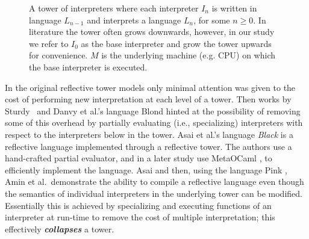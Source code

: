 \documentclass[sigplan,anonymous,review]{acmart}
\theoremstyle{definition}
\begin{document}
\begin{figure}[t]
    \centering
    \caption{A tower of interpreters where each interpreter $I_n$ is written in language $L_{n-1}$ and interprets a language $L_n$, for some $n \geq 0$. In literature the tower often grows downwards, however, in our study we refer to $I_0$ as the base interpreter and grow the tower upwards for convenience. $M$ is the underlying machine (e.g. CPU) on which the base interpreter is executed.}
    \label{fig:tombstone_tower_ex1}
\end{figure}

In the original reflective tower models only minimal attention was given to the cost of performing new interpretation at each level of a tower. Then works by Sturdy~\cite{sturdy1993lisp} and Danvy et al.'s language Blond \cite{danvy1988intensions} hinted at the possibility of removing some of this overhead by partially evaluating (i.e., specializing) interpreters with respect to the interpreters below in the tower. Asai et al.'s language \textit{Black} \cite{asai1996duplication} is a reflective language implemented through a reflective tower. The authors use a hand-crafted partial evaluator, and in a later study use MetaOCaml \cite{asai2015compiling}, to efficiently implement the language. Asai and then, using the language Pink \cite{amin2017collapsing}, Amin et al.~demonstrate the ability to compile a reflective language even though the semantics of individual interpreters in the underlying tower can be modified. Essentially this is achieved by specializing and executing functions of an interpreter at run-time to remove the cost of multiple interpretation; this effectively \textbf{\textit{collapses}} a tower.
\end{document}

